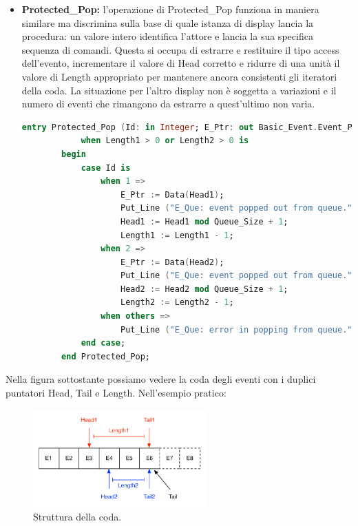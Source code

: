 \documentclass[aps,letterpaper,10pt]{article}
\begin{document}
\begin{itemize}
		\begin{lstlisting}[language=Ada]
		entry Protected_Push (E_Ptr: in Basic_Event.Event_Ptr) 
			when Length1 < Queue_Size and Length2 < Queue_Size is
		begin
	        Data(Tail) := E_Ptr;
	        Tail := Tail mod Queue_Size + 1;
	        Tail1 := Tail1 mod Queue_Size + 1;
	        Tail2 := Tail2 mod Queue_Size + 1;
	        Length1 := Length1 + 1;
	        Length2 := Length2 + 1;
		end Protected_Push;
		\end{lstlisting}	

	\item \textbf{Protected\_Pop:} l'operazione di Protected\_Pop funziona in maniera similare ma discrimina sulla base di quale istanza di display lancia la procedura: un valore intero identifica l'attore e lancia la sua specifica sequenza di comandi. Questa si occupa di estrarre e restituire il tipo access dell'evento, incrementare il valore di Head corretto e ridurre di una unit\`a il valore di Length appropriato per mantenere ancora consistenti gli iteratori della coda. La situazione per l'altro display non \`e soggetta a variazioni e il numero di eventi che rimangono da estrarre a quest'ultimo non varia.
	
		\begin{lstlisting}[language=Ada]
		entry Protected_Pop (Id: in Integer; E_Ptr: out Basic_Event.Event_Ptr) 
			when Length1 > 0 or Length2 > 0 is
		begin
			case Id is
				when 1 => 
					E_Ptr := Data(Head1);
					Put_Line ("E_Que: event popped out from queue.");
			        Head1 := Head1 mod Queue_Size + 1;
			        Length1 := Length1 - 1;
				when 2 =>
					E_Ptr := Data(Head2);
					Put_Line ("E_Que: event popped out from queue.");
			        Head2 := Head2 mod Queue_Size + 1;
			        Length2 := Length2 - 1;
				when others =>
					Put_Line ("E_Que: error in popping from queue.");
			end case;
		end Protected_Pop;
		\end{lstlisting}	
\end{itemize}

Nella figura sottostante possiamo vedere la coda degli eventi con i duplici puntatori Head, Tail e Length. Nell'esempio pratico: 

\begin{figure}[H]
	\begin{center}
		\includegraphics[width=250px]{images/queue-struct.pdf}
	\end{center}
	\caption{Struttura della coda.}
\end{figure}
\end{document}

